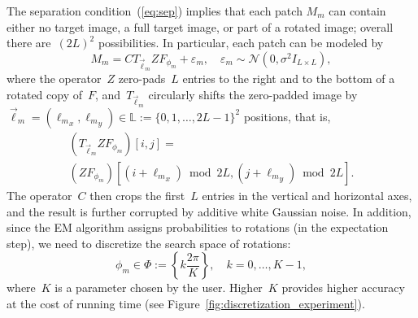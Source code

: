 \documentclass{article}
\begin{document}
The separation condition~(\ref{eq:sep}) implies that each patch $M_m$ can contain either no target image, a full  target image, or part of a rotated image; overall there are~$(2L)^2$  possibilities. In particular, each patch can be modeled by
\begin{equation}
\label{eq:patch}
M_m = C T_{\vec{\ell}_m} Z F_{\phi_m} + \varepsilon_m, \quad \varepsilon_m \sim \mathcal{N}(0, \sigma^2 I_{L \times L}),
\end{equation}
where the operator~$Z$ \mbox{zero-pads}~$L$ entries to the right and to the bottom of a rotated copy of~$F$, and~$T_{\vec{\ell}_m}$ circularly shifts the \mbox{zero-padded} image by~\mbox{$\vec{\ell}_m = ({\ell_m}_x, {\ell_m}_y)\in \mathbb{L} := \{0, 1, \ldots, 2L-1\}^2$} positions, that is,
\begin{multline}
(T_{\vec{\ell}_m} Z F_{\phi_m} )\left[i, j\right] = \\(Z F_{\phi_m}) \left[(i + {\ell_m}_x) \bmod 2L, (j + {\ell_m}_y) \bmod  2L\right].
\end{multline}
The operator~$C$ then crops the first~$L$ entries in the vertical and horizontal axes, and the result is further corrupted by additive white Gaussian noise. In addition, since the EM algorithm assigns probabilities to rotations (in the expectation step), we need to discretize the search space of rotations:
\begin{equation}
\label{eq:Phi_set}
\phi_m \in \Phi := \left\{k \frac{2\pi}{K}\right\}, \quad k=0,\ldots,K-1,
\end{equation}
where~$K$ is a parameter chosen by the user. Higher~$K$ provides higher accuracy at the cost of running time (see Figure~\ref{fig:discretization_experiment}).
\end{document}
